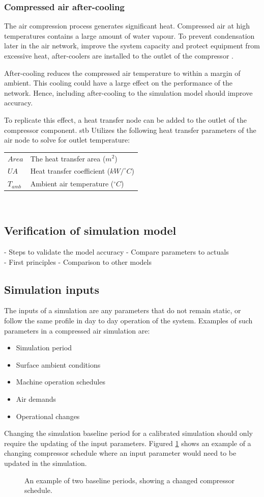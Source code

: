 		\subsubsection{Compressed air after-cooling}
		The air compression process generates significant heat. Compressed air at high temperatures contains a large amount of water vapour. To prevent condensation later in the air network, improve the system capacity and protect equipment from excessive heat, after-coolers are installed to the outlet of the compressor \cite{schroeder2009energy}.
		\par 
		After-cooling reduces the compressed air temperature to within a margin of ambient. This cooling could have a large effect on the performance of the network. Hence, including after-cooling to the simulation model should improve accuracy.
		\par 
		To replicate this effect, a heat transfer node can be added to the outlet of the compressor component. \gls{stb} Utilizes the following heat transfer parameters of the air node to solve for outlet temperature: 
		\begin{tabular}{p{1.3cm}p{13cm}}
			$Area$ & The heat transfer area ($m^2$) \\
			$UA$ & Heat transfer coefficient ($kW/^{\circ} C$) \\
			$T_{amb}$ & Ambient air temperature ($^{\circ} C$) \\
		\end{tabular} \\	
	\subsection{Verification of simulation model}
		- Steps to validate  the model accuracy - Compare parameters to actuals\\
		- First principles     - Comparison to other models
	\subsection{Simulation inputs}
		The inputs of a simulation are any parameters that do not remain static, or follow the same profile in day to day operation of the system. Examples of such parameters in a compressed air simulation are:
		\begin{itemize}
			\item Simulation period
			\item Surface ambient conditions
			\item Machine operation schedules
			\item Air demands
			\item Operational changes
		\end{itemize} 
		Changing the simulation baseline period for a calibrated simulation should only require the updating of the input parameters. Figured \ref{fig: Compressor schedule} shows an example of a changing compressor schedule where an input parameter would need to be updated in the simulation.
		\begin{figure}[h]
			\centering
			\fbox{}
			\caption{An example of two baseline periods, showing a changed compressor schedule.}
			\label{fig: Compressor schedule}
		\end{figure}
